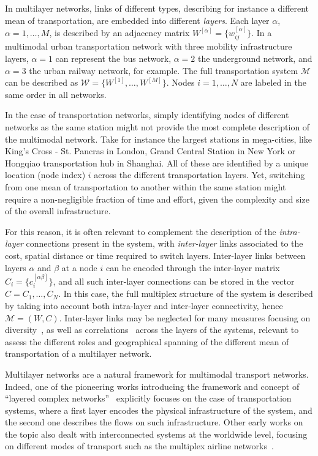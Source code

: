 In multilayer networks, links of different types, describing for instance a different mean of transportation, are embedded into different \textit{layers}. Each layer $\alpha$, $\alpha = 1, \ldots, M$, is described by an adjacency matrix $W^{[\alpha]} = \{w_{ij}^{[\alpha]}\}$. In a multimodal urban transportation network with three mobility infrastructure layers, $\alpha=1$ can represent the bus network, $\alpha=2$ the underground network, and $\alpha=3$ the urban railway network, for example. The full transportation system $\mathcal M$ can be described as $\mathcal W = \{ W^{[1]}, \ldots,  W^{[M]}\}$. Nodes $i=1, \dots, N$ are labeled in the same order in all networks. 

In the case of transportation networks, simply identifying nodes of different networks as the same station might not provide the most complete description of the multimodal network. Take for instance the largest stations in mega-cities, like King's Cross - St. Pancras in London, Grand Central Station in New York or Hongqiao transportation hub in Shanghai. All of these are identified by a unique location (node index) $i$ across the different transportation layers. Yet, switching from one mean of transportation to another within the same station might require a non-negligible fraction of time and effort, given the complexity and size of the overall infrastructure. 

For this reason, it is often relevant to complement the description of the \textit{intra-layer} connections present in the system, with \textit{inter-layer} links associated to the cost, spatial distance or time required to switch layers. Inter-layer links between layers $\alpha$ and $\beta$ at a node $i$ can be encoded through the inter-layer matrix $C_i=\{c_i^{[\alpha \beta]} \}$, and all such inter-layer connections can be stored in the vector $ C = {C_1, \ldots, C_N}$. In this case, the full multiplex structure of the system is described by taking into account both intra-layer and inter-layer connectivity, hence $\mathcal M = ( W,  C)$. Inter-layer links may be neglected for many measures focusing on diversity~\cite{battiston2014structural}, as well as correlations~\cite{nicosia2015measuring} across the layers of the systems, relevant to assess the different roles and geographical spanning of the different mean of transportation of a multilayer network. 

Multilayer networks are a natural framework for multimodal transport networks. Indeed, one of the pioneering works introducing the framework and concept of ``layered complex networks''~\cite{kurant2006layered} explicitly focuses on the case of transportation systems, where a first layer encodes the physical infrastructure of the system, and the second one describes the flows on such infrastructure. Other early works on the topic also dealt with interconnected systems at the worldwide level, focusing on different modes of transport such as the multiplex airline networks~\cite{cardillo2013emergence}.

